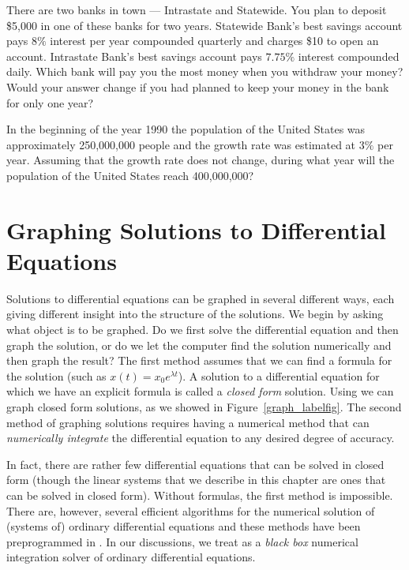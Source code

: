 \documentclass{ximera}
\begin{document}
\begin{exercise} \label{c3.1.9}
There are two banks in town --- Intrastate and Statewide.  You plan
to deposit \$5,000 in one of these banks for two years.  Statewide Bank's
best savings account pays $8\%$ interest per year compounded quarterly
and charges \$10 to open an account.  Intrastate Bank's best savings
account pays $7.75\%$ interest compounded daily.  Which bank will
pay you the most money when you withdraw your money?  Would your
answer change if you had planned to keep your money in the bank
for only one year?
\end{exercise}

\begin{exercise} \label{c3.1.10}
In the beginning of the year 1990 the population of the United States was
approximately 250,000,000 people and the growth rate was estimated at $3\%$
per year.  Assuming that the growth rate does not change, during what year
will the population of the United States reach 400,000,000?
\end{exercise}


\section{Graphing Solutions to Differential Equations}
\label{S:3.2}

Solutions to differential equations can be graphed in several
different ways, each giving different insight into the structure
of the solutions.  We begin by asking what object is to be
graphed.  Do we first solve the differential equation and then
graph the solution, or do we let the computer find the solution
numerically and then graph the result?  The first method assumes
that we can find a formula for the solution (such as
$x(t)=x_0e^{\lambda t}$).  A solution to a differential equation
for which we have an explicit formula is called a {\em closed
form\/} solution.  Using \Matlab we
can graph closed form solutions, as we showed in
Figure~\ref{graph_labelfig}. The second method of graphing
solutions requires having a numerical method that can {\em
numerically integrate\/} the differential equation to any
desired degree of accuracy.

In fact, there are rather few differential equations that can be
solved in closed form (though the linear systems that we
describe in this chapter are ones that can be solved in closed
form).  Without formulas, the first method is impossible.  There
are, however, several efficient algorithms for the numerical
solution of (systems of) ordinary differential equations and
these methods have been preprogrammed in \Matlabp.  In our
discussions, we treat \Matlab as a {\em black box\/} numerical
integration solver of ordinary differential equations.
\end{document}
